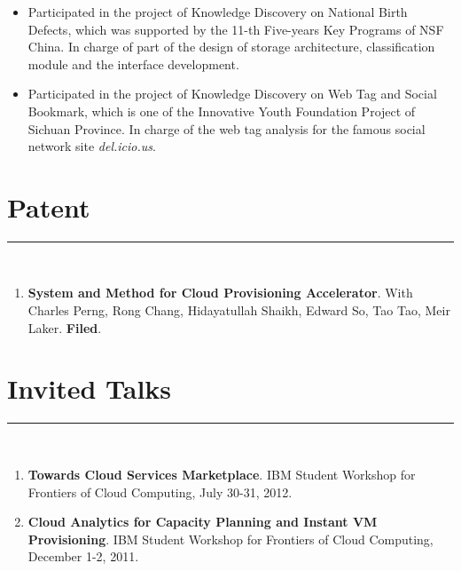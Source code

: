 \documentclass{res}
\begin{document}
\begin{resume}
\begin{tabbing}
   \end{tabbing}      %
   \vspace{-5pt}
   \begin{itemize}
    \item   Participated in the project of Knowledge Discovery on National Birth Defects, which was supported by the 11-th Five-years Key Programs of NSF China. In charge of part of the design of storage architecture, classification module and the interface development.
    \item   Participated in the project of Knowledge Discovery on Web Tag and Social Bookmark, which is one of the Innovative Youth Foundation Project of Sichuan Province. In charge of the web tag analysis for the famous social network site \textit{del.icio.us}.
   \end{itemize}

\section{\bfseries\Large Patent}
\hspace{-0.5in}\rule{16.8cm}{0.4pt}\\[-0.4cm]
    \begin{enumerate}
        \item \textbf{System and Method for Cloud Provisioning Accelerator}. With Charles Perng, Rong Chang, Hidayatullah Shaikh, Edward So, Tao Tao, Meir Laker. \textbf{Filed}.
    \end{enumerate}
		
\section{\bfseries\Large Invited Talks}
\hspace{-0.5in}\rule{16.8cm}{0.4pt}\\[-0.3cm]
    \begin{enumerate}
        \item   \textbf{Towards Cloud Services Marketplace}. IBM Student Workshop for Frontiers of Cloud Computing, July 30-31, 2012.
        \item   \textbf{Cloud Analytics for Capacity Planning and Instant VM Provisioning}. IBM Student Workshop for Frontiers of Cloud Computing, December 1-2, 2011.
    \end{enumerate}


\end{resume}
\end{document}
